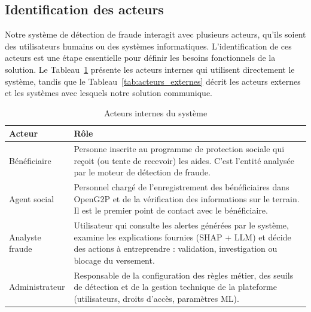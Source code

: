 \documentclass[a4paper, oneside, 12pt]{book}
\newcommand{\thead}[1]{\cellcolor{EYdark}\textcolor{white}{\textbf{#1}}}
\renewcommand{\thead}[1]{\cellcolor{EYyellow}\textcolor{EYdark}{\textbf{#1}}}
\begin{document}
\subsection{Identification des acteurs}
\hspace{0.5cm}Notre système de détection de fraude interagit avec plusieurs acteurs, qu'ils soient des utilisateurs humains ou des systèmes informatiques. L'identification de ces acteurs est une étape essentielle pour définir les besoins fonctionnels de la solution. Le Tableau~\ref{tab:acteurs_internes} présente les acteurs internes qui utilisent directement le système, tandis que le Tableau~\ref{tab:acteurs_externes} décrit les acteurs externes et les systèmes avec lesquels notre solution communique.

\begin{table}[H]
\centering
\renewcommand{\arraystretch}{1.4}
\begin{tabular}{|p{4cm}|p{11cm}|}
\hline
\thead{Acteur} & \thead{Rôle} \\
\hline
Bénéficiaire &
Personne inscrite au programme de protection sociale qui reçoit (ou tente de recevoir) les aides. C'est l'entité analysée par le moteur de détection de fraude. \\
\hline
Agent social &
Personnel chargé de l'enregistrement des bénéficiaires dans OpenG2P et de la vérification des informations sur le terrain. Il est le premier point de contact avec le bénéficiaire. \\
\hline
Analyste fraude &
Utilisateur qui consulte les alertes générées par le système, examine les explications fournies (SHAP + LLM) et décide des actions à entreprendre : validation, investigation ou blocage du versement. \\
\hline
Administrateur &
Responsable de la configuration des règles métier, des seuils de détection et de la gestion technique de la plateforme (utilisateurs, droits d'accès, paramètres ML). \\
\hline

\end{tabular}
\caption{Acteurs internes du système}
\label{tab:acteurs_internes}
\end{table}
\end{document}
